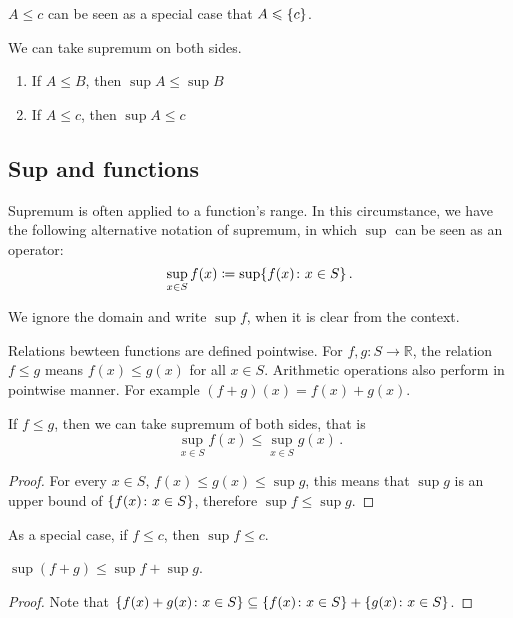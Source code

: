 \documentclass{article}
\newcommand{\R}{\mathbb R}
\DeclarePairedDelimiter\set{\lbrace}{\rbrace}
\begin{document}
$ A \leqslant c $ can be seen as a special case that $ A \leqslant \set{c} $.

\begin{theorem} We can take supremum on both sides.
    \begin{enumerate}
        \item If $ A \leqslant B $, then $ \sup A \leqslant \sup B $
        \item If $ A \leqslant c $, then $ \sup A \leqslant c $
    \end{enumerate}
\end{theorem}


\subsection{Sup and functions}
Supremum is often applied to a function's range. In this circumstance, we have the following alternative notation of supremum, in which $ \sup $ can be seen as an operator:
\[ 
    \sup_{x \in S} f(x) \coloneq \sup \set{f(x) \colon x \in S} \,.
\]

We ignore the domain and write $ \sup f $, when it is clear from the context.

Relations bewteen functions are defined pointwise. For $ f, g \colon S \to \R $, the relation $ f \leqslant g $ means $ f(x) \leqslant g(x) $ for all $ x \in S $. Arithmetic operations also perform in pointwise manner. For example $ (f + g)(x) = f(x) + g(x) $.


\begin{theorem}
    If $ f \leqslant g $, then we can take supremum of both sides, that is
    \[ 
        \sup_{x \in S} f(x) \leqslant \sup_{x \in S} g(x) \,.
    \]
\end{theorem}

\begin{proof}
    For every $ x \in S $, $ f(x) \leqslant g(x) \leqslant \sup g $, this means that $ \sup g $ is an upper bound of $ \set{f(x) \colon x \in S} $, therefore $ \sup f \leqslant \sup g $.
\end{proof}

As a special case, if $ f \leqslant c $, then $ \sup f \leqslant c $.


\begin{theorem}
    $ \sup (f + g) \leqslant \sup f + \sup g $.
\end{theorem}

\begin{proof}
    Note that $ \set{f(x) + g(x) \colon x \in S} \subseteq \set{f(x) \colon x \in S} + \set{g(x) \colon x \in S} $.
\end{proof}
\end{document}
